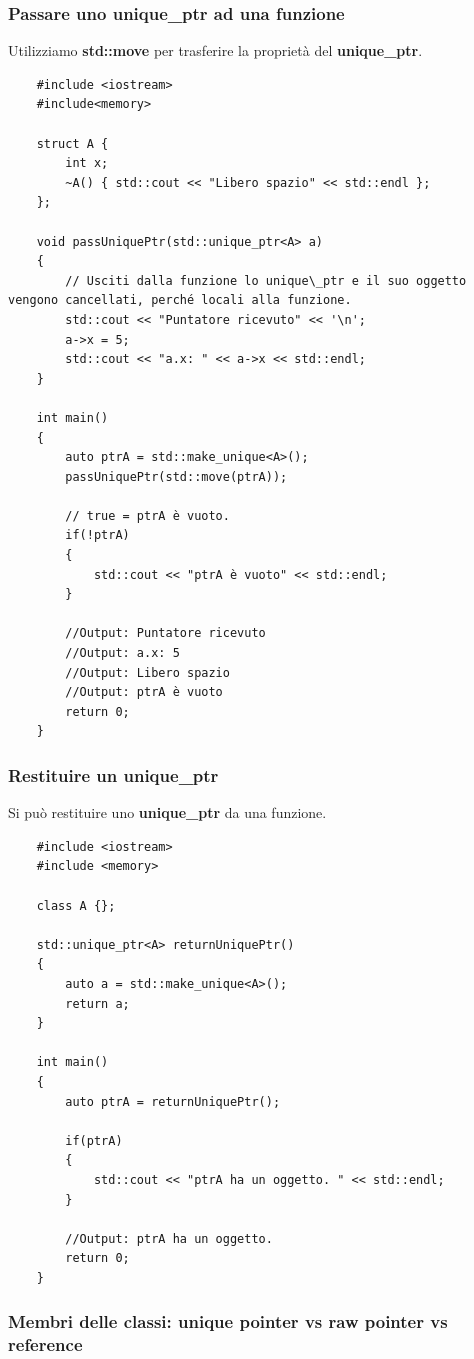 \subsubsection{Passare uno unique\_ptr ad una funzione}

\textsf{\small Utilizziamo \textbf{std::move} per trasferire la proprietà del \textbf{unique\_ptr}.} \\

\begin{lstlisting}
	#include <iostream>
	#include<memory>
	
	struct A {
		int x;
		~A() { std::cout << "Libero spazio" << std::endl };
	};

	void passUniquePtr(std::unique_ptr<A> a)
	{
		// Usciti dalla funzione lo unique\_ptr e il suo oggetto vengono cancellati, perché locali alla funzione.
		std::cout << "Puntatore ricevuto" << '\n';
		a->x = 5;
		std::cout << "a.x: " << a->x << std::endl;
	}

	int main()
	{
		auto ptrA = std::make_unique<A>();
		passUniquePtr(std::move(ptrA));
		
		// true = ptrA è vuoto.
		if(!ptrA)
		{
			std::cout << "ptrA è vuoto" << std::endl;
		}
	
		//Output: Puntatore ricevuto
		//Output: a.x: 5
		//Output: Libero spazio
		//Output: ptrA è vuoto
		return 0;
	}
\end{lstlisting} 

\subsubsection{Restituire un unique\_ptr}

\textsf{\small Si può restituire uno \textbf{unique\_ptr} da una funzione. } \\

\begin{lstlisting}
	#include <iostream>
	#include <memory>
	
	class A {};
	
	std::unique_ptr<A> returnUniquePtr()
	{
		auto a = std::make_unique<A>();
		return a;
	}

	int main()
	{
		auto ptrA = returnUniquePtr();
		
		if(ptrA)
		{
			std::cout << "ptrA ha un oggetto. " << std::endl;	
		}
	
		//Output: ptrA ha un oggetto.
		return 0;
	}
\end{lstlisting}

\subsubsection{Membri delle classi: unique pointer vs raw pointer vs reference}

